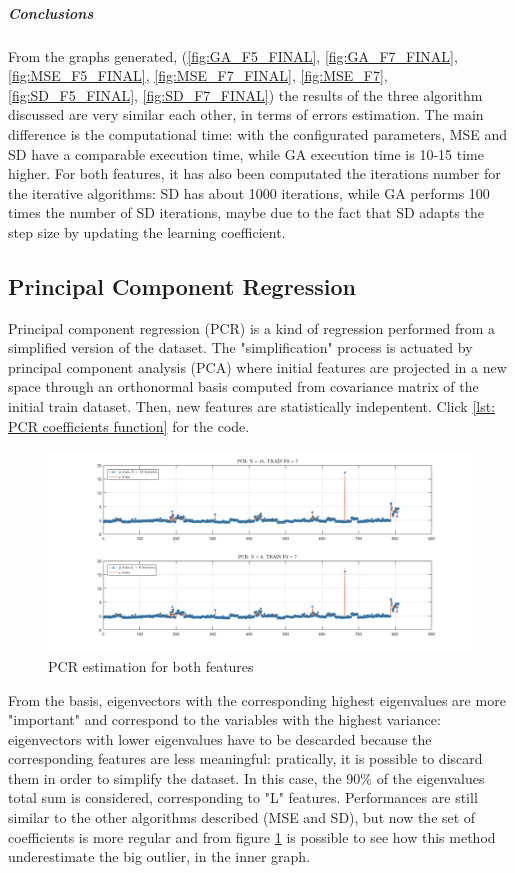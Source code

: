 \documentclass{article}
\begin{document}
\subparagraph{Conclusions}
From the graphs generated, (\ref{fig:GA_F5_FINAL}, \ref{fig:GA_F7_FINAL}, \ref{fig:MSE_F5_FINAL}, \ref{fig:MSE_F7_FINAL}, \ref{fig:MSE_F7}, \ref{fig:SD_F5_FINAL}, \ref{fig:SD_F7_FINAL}) the results of the three algorithm discussed are very similar each other, in terms of errors estimation. The main difference is the computational time: with the configurated parameters, MSE and SD have a comparable execution time, while GA execution time is 10-15 time higher. For both features, it has also been computated the iterations number for the iterative algorithms: SD has about 1000 iterations, while GA performs 100 times the number of SD iterations, maybe due to the fact that SD adapts the step size by updating the learning coefficient. 

\subsection{Principal Component Regression}
Principal component regression (PCR) is a kind of regression performed from a simplified version of the dataset. The "simplification" process is actuated by principal component analysis (PCA) where initial features are projected in a new space through an orthonormal basis computed from covariance matrix of the initial train dataset. Then, new features are statistically indepentent. Click \ref{lst: PCR coefficients function} for the code.

\begin{figure}
	\includegraphics[width=1\linewidth]{pictures/PCR.png} 
	\caption{PCR estimation for both features}
	\label{fig:PCR}
\end{figure}

From the basis, eigenvectors with the corresponding highest eigenvalues are more "important" and correspond to the variables with the highest variance: eigenvectors with lower eigenvalues have to be descarded because the corresponding features are less meaningful: pratically, it is possible to discard them in order to simplify the dataset. In this case, the 90\% of the eigenvalues total sum is considered, corresponding to "L" features.
Performances are still similar to the other algorithms described (MSE and SD), but now the set of coefficients is more regular and from figure \ref{fig:PCR} is possible to see how this method underestimate the big outlier, in the inner graph. \\
\end{document}
